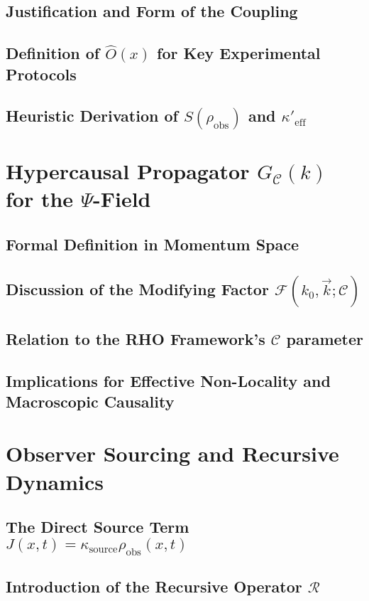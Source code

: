 \documentclass[11pt, a4paper]{book}
\begin{document}
\subsection{Justification and Form of the Coupling}
\subsection{Definition of $\hat{O}(x)$ for Key Experimental Protocols}
\subsection{Heuristic Derivation of $S(\rho_{\text{obs}})$ and $\kappa'_{\text{eff}}$}

\section{Hypercausal Propagator $G_\mathcal{C}(k)$ for the $\Psi$-Field}
\subsection{Formal Definition in Momentum Space}
\subsection{Discussion of the Modifying Factor $\mathcal{F}(k_0, \vec{k}; \mathcal{C})$}
\subsection{Relation to the RHO Framework's $\mathcal{C}$ parameter}
\subsection{Implications for Effective Non-Locality and Macroscopic Causality}

\section{Observer Sourcing and Recursive Dynamics}
\subsection{The Direct Source Term $J(x,t) = \kappa_{\text{source}} \rho_{\text{obs}}(x,t)$}
\subsection{Introduction of the Recursive Operator $\mathcal{R}$}
\end{document}
